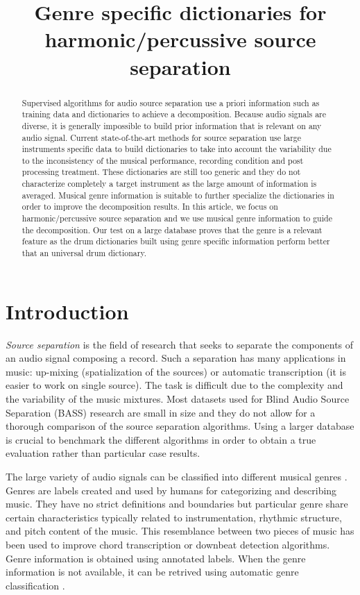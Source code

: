 \documentclass{article}
\title{Genre specific dictionaries for harmonic/percussive source separation}
\begin{document}
%
\maketitle
%
\begin{abstract}

Supervised algorithms for audio source separation use a priori information such as training data and dictionaries to achieve a decomposition. Because audio signals are diverse, it is generally impossible to build prior information that is relevant on any audio signal. Current state-of-the-art methods for source separation use large instruments specific data to build dictionaries to take into account the variability due to the inconsistency of the musical performance, recording condition and post processing treatment. These dictionaries are still too generic and they do not characterize completely a target instrument as the large amount of information is averaged. Musical genre information is suitable to further specialize the dictionaries in order to improve the decomposition results.
 In this article, we focus on harmonic/percussive source separation and we use musical genre information to guide the decomposition. Our test on a large database proves that the genre is a relevant feature as the drum dictionaries built using genre specific information perform better that an universal drum dictionary.  




\end{abstract}
%
\section{Introduction}\label{sec:introduction}


\emph{Source separation} is the field of ​​research that seeks to separate the components of an audio signal composing a record. Such a separation has many applications in music: up-mixing \cite{fitzgerald2011upmixing} (spatialization of the sources) or automatic transcription \cite{vincent2010adaptive} (it is easier to work on single source). The task is difficult due to the complexity and the variability of the music mixtures. Most datasets used for Blind Audio Source Separation (BASS) research are small in size and they do not allow for a thorough comparison of the source separation algorithms. Using a larger database is crucial to benchmark the different algorithms in order to obtain a true evaluation rather than particular case results. 

The large variety of audio signals can be classified into different musical genres \cite{tzanetakis2002musical}. Genres are labels created and used by humans for categorizing and describing music. They have no strict definitions and boundaries but particular genre share certain characteristics typically related to instrumentation, rhythmic structure, and pitch content of the music. This resemblance between two pieces of music has been used to improve chord transcription \cite{ni2012using,lee2008acoustic} or downbeat detection \cite{hockman2012one} algorithms. Genre information is obtained using annotated labels. When the genre information is not available, it can be retrived using automatic genre classification \cite{tzanetakis2002musical,mckay2006musical}.
\end{document}
